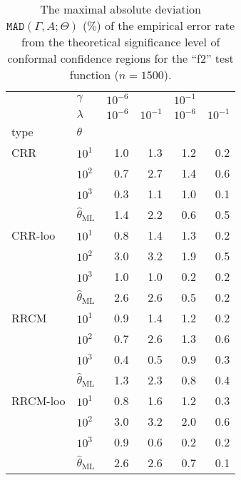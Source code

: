 \documentclass[conference]{IEEEtran}
\begin{document}
\begin{table}
  \centering
  \caption{The maximal absolute deviation $\mathtt{MAD}(\Gamma, A; \Theta)$ ($\%$)
  of the empirical error rate from the theoretical significance level of conformal
  confidence regions for the ``f2'' test function ($n=1500$).}
  \label{tab:nongaussian_f2_2d_cov_conf}
  \begin{tabular}{ll||rrrr}
  \toprule
       & $\gamma$ & $10^{-6}$ &          & $10^{-1}$ &          \\\cline{2-2}
       & $\lambda$ & $10^{-6}$ & $10^{-1}$ & $10^{-6}$ & $10^{-1}$ \\\cline{2-2}
  type & $\theta$ &          &          &          &          \\
  \midrule
  CRR & $10^1$ &      1.0 &      1.3 &      1.2 &      0.2 \\
       & $10^2$ &      0.7 &      2.7 &      1.4 &      0.6 \\
       & $10^3$ &      0.3 &      1.1 &      1.0 &      0.1 \\
       & $\hat{\theta}_\text{ML}$ &      1.4 &      2.2 &      0.6 &      0.5 \\
  \midrule
  CRR-loo & $10^1$ &      0.8 &      1.4 &      1.3 &      0.2 \\
       & $10^2$ &      3.0 &      3.2 &      1.9 &      0.5 \\
       & $10^3$ &      1.0 &      1.0 &      0.2 &      0.2 \\
       & $\hat{\theta}_\text{ML}$ &      2.6 &      2.6 &      0.5 &      0.2 \\
  \midrule
  RRCM & $10^1$ &      0.9 &      1.4 &      1.2 &      0.2 \\
       & $10^2$ &      0.7 &      2.6 &      1.3 &      0.6 \\
       & $10^3$ &      0.4 &      0.5 &      0.9 &      0.3 \\
       & $\hat{\theta}_\text{ML}$ &      1.3 &      2.3 &      0.8 &      0.4 \\
  \midrule
  RRCM-loo & $10^1$ &      0.8 &      1.6 &      1.2 &      0.3 \\
       & $10^2$ &      3.0 &      3.2 &      2.0 &      0.6 \\
       & $10^3$ &      0.9 &      0.6 &      0.2 &      0.2 \\
       & $\hat{\theta}_\text{ML}$ &      2.6 &      2.6 &      0.7 &      0.1 \\
  \bottomrule
  \end{tabular}
\end{table}
\end{document}
